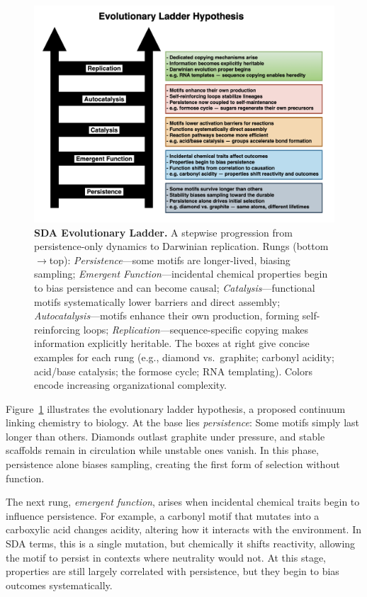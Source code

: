 \documentclass[life,article,submit,pdftex,moreauthors]{Definitions/mdpi}
\begin{document}
\begin{figure}[H]
\centering
\includegraphics[width=\textwidth]{SDA-ladder.png}
\caption{\textbf{SDA Evolutionary Ladder.} A stepwise progression from persistence-only dynamics to Darwinian replication. 
Rungs (bottom$\rightarrow$top): \emph{Persistence}—some motifs are longer-lived, biasing sampling; 
\emph{Emergent Function}—incidental chemical properties begin to bias persistence and can become causal; 
\emph{Catalysis}—functional motifs systematically lower barriers and direct assembly; 
\emph{Autocatalysis}—motifs enhance their own production, forming self-reinforcing loops; 
\emph{Replication}—sequence-specific copying makes information explicitly heritable. 
The boxes at right give concise examples for each rung (e.g., diamond vs.\ graphite; carbonyl acidity; acid/base catalysis; the formose cycle; RNA templating). 
Colors encode increasing organizational complexity.}
\label{fig:sda-ladder}
\end{figure}

Figure~\ref{fig:sda-ladder} illustrates the evolutionary ladder hypothesis, a proposed continuum linking chemistry to biology. At the base lies \emph{persistence}: Some motifs simply last longer than others. Diamonds outlast graphite under pressure, and stable scaffolds remain in circulation while unstable ones vanish. In this phase, persistence alone biases sampling, creating the first form of selection without function.  

The next rung, \emph{emergent function}, arises when incidental chemical traits begin to influence persistence. For example, a carbonyl motif that mutates into a carboxylic acid changes acidity, altering how it interacts with the environment. In SDA terms, this is a single mutation, but chemically it shifts reactivity, allowing the motif to persist in contexts where neutrality would not. At this stage, properties are still largely correlated with persistence, but they begin to bias outcomes systematically.  
\end{document}
